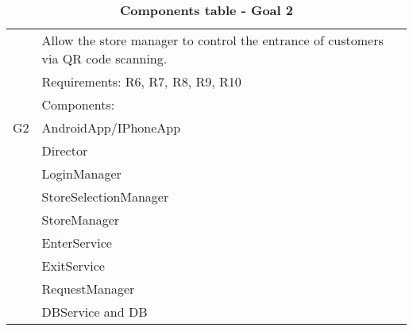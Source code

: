 \begin{table}
\begin{flushleft}
\begin{tabular}{|l|l|}
\hline
\cellcolor[HTML]{EC8D78}& \cellcolor[HTML]{F4D5CE}Allow the store manager to control the entrance of customers via QR code scanning.\\
\cline{2-2}
\cellcolor[HTML]{EC8D78}& \cellcolor[HTML]{F4D5CE}Requirements: R6, R7, R8, R9, R10\\
\cline{2-2}
\cellcolor[HTML]{EC8D78}&Components:\\

\cellcolor[HTML]{EC8D78}G2&\quad\quad AndroidApp/IPhoneApp\\

\cellcolor[HTML]{EC8D78}&\quad\quad	Director \\

\cellcolor[HTML]{EC8D78}&\quad\quad	LoginManager \\

\cellcolor[HTML]{EC8D78}&\quad\quad	StoreSelectionManager \\

\cellcolor[HTML]{EC8D78}&\quad\quad	StoreManager \\

\cellcolor[HTML]{EC8D78}&\quad\quad\quad\quad EnterService \\

\cellcolor[HTML]{EC8D78}&\quad\quad\quad\quad ExitService \\

\cellcolor[HTML]{EC8D78}&\quad\quad	RequestManager \\

\cellcolor[HTML]{EC8D78}&\quad\quad	DBService and DB \\
\hline
\end{tabular}
\end{flushleft}
\caption{\textbf{Components table - Goal 2}}
\label{tab:comp1}
\end{table}


\newpage

